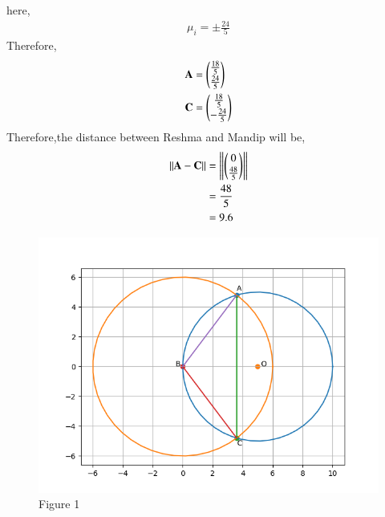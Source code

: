 \documentclass[A4,11pt,twocolumn]{IEEEtran}
\begin{document}
here, 
\begin{align}
\mu_i = \pm \frac{24}{5}
\end{align}
Therefore,
\begin{align}
\mathbf{A} &= \begin{pmatrix}\frac{18}{5}\\[1pt] \frac{24}{5}\end{pmatrix}\\
\mathbf{C} &= \begin{pmatrix}\frac{18}{5}\\[1pt] -\frac{24}{5}\end{pmatrix}
\end{align}
Therefore,the distance between Reshma and Mandip will be,
\begin{align}
\left\lVert\mathbf{A} - \mathbf{C}\right\rVert &= \left\lVert\begin{pmatrix}0\\[1pt] \frac{48}{5}\end{pmatrix}\right\rVert\\ &= \frac{48}{5}\\ &= 9.6
\end{align}
\begin{figure}[h!]
  \centering
    \includegraphics[width=\columnwidth]{figs/Figure_1.png}
    \caption{Figure 1}
    \label{fig:}
\end{figure}
\end{document}
